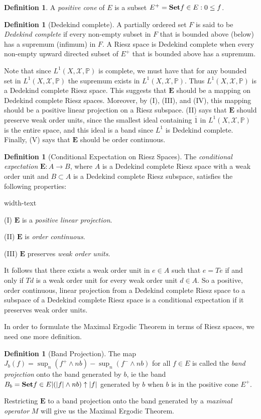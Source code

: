 \documentclass[letterpaper,10pt,oneside,onecolumn,reqno]{amsart}
\renewcommand{\P}{\mathbb P}
\newcommand{\X}{\mathcal X}
\theoremstyle{definition}
\newtheorem{defn}[thm]{Definition}
\newcommand{\catname}[1]{{\normalfont\textbf{#1}}}
\newcommand{\Set}{\catname{Set}}
\renewcommand{\bar}[1]{\overline{#1}}
\begin{document}
\begin{defn}
A \emph{positive cone} of $E$ is a subset $E^+ = \Set{f \in E : 0 \leq f}$.
\end{defn}


\begin{defn}[Dedekind complete]
A partially ordered set $F$ is said to be \emph{Dedekind complete} if every non-empty subset in $F$ that is bounded above (below) has a supremum (infimum) in $F$. A Riesz space is Dedekind complete when every non-empty upward directed subset of $E^+$ that is bounded above has a supremum.
\end{defn}


Note that since $L^1(X,\X,\P)$ is complete, we must have that for any bounded set in $L^1(X,\X,\P)$ the supremum exists in $L^1(X,\X,\P)$. Thus $L^1(X,\X,\P)$ is a Dedekind complete Riesz space. This suggests that $\mathbf{E}$ should be a mapping on Dedekind complete Riesz spaces. Moreover, by (I), (III), and (IV), this mapping should be a positive linear projection on a Riesz subspace. (II) says that $\mathbf{E}$ should preserve weak order units, since the smallest ideal containing $\bar{1}$ in $L^1(X,\X,\P)$ is the entire space, and this ideal is a band since $L^1$ is Dedekind complete. Finally, (V) says that $\mathbf{E}$ should be order continuous. 

\begin{defn}[Conditional Expectation on Riesz Spaces]
The \emph{conditional expectation} $\mathbf{E}: A \to B$, where $A$ is a Dedekind complete Riesz space with a weak order unit and $B \subset A$ is a Dedekind complete Riesz subspace, satisfies the following properties:

\begin{deflist}{width-text}
\item[(I)] $\mathbf{E}$ is a \emph{positive linear projection}.
\item[(II)] $\mathbf{E}$ is \emph{order continuous}.
\item[(III)] $\mathbf{E}$ preserves \emph{weak order units}.
\end{deflist}

It follows that there exists a weak order unit in $e \in A$ such that $e = Te$ if and only if $Td$ is a weak order unit for every weak order unit $d \in A$. So a positive, order continuous, linear projection from a Dedekind complete Riesz space to a subspace of a Dedekind complete Riesz space is a conditional expectation if it preserves weak order units.
\end{defn}

In order to formulate the Maximal Ergodic Theorem in terms of Riesz spaces, we need one more definition. 

\begin{defn}[Band Projection]
The map $J_b(f) = \sup_n (f^+ \wedge nb) - \sup_n(f^- \wedge nb)$ for all $f \in E$ is called the \emph{band projection} onto the band generated by $b$, ie the band $B_b = \Set{f \in E | (|f| \wedge nb) \uparrow |f|}$ generated by $b$ when $b$ is in the positive cone $E^+$. 
\end{defn}

Restricting $\mathbf{E}$ to a band projection onto the band generated by a \emph{maximal operator} $M$ will give us the Maximal Ergodic Theorem.
\end{document}
